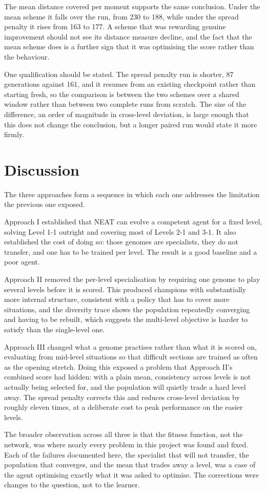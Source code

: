\noindent
The mean distance covered per moment supports the same conclusion. Under the
mean scheme it falls over the run, from 230 to 188, while under the spread
penalty it rises from 163 to 177. A scheme that was rewarding genuine
improvement should not see its distance measure decline, and the fact that the
mean scheme does is a further sign that it was optimising the score rather than
the behaviour.

\noindent
One qualification should be stated. The spread penalty run is shorter, 87
generations against 161, and it resumes from an existing checkpoint rather than
starting fresh, so the comparison is between the two schemes over a shared
window rather than between two complete runs from scratch. The size of the
difference, an order of magnitude in cross-level deviation, is large enough
that this does not change the conclusion, but a longer paired run would state
it more firmly.

\section{Discussion}
\label{sec:discussion}

The three approaches form a sequence in which each one addresses the limitation
the previous one exposed.

\noindent
Approach I established that NEAT can evolve a competent agent for a fixed
level, solving Level 1-1 outright and covering most of Levels 2-1 and 3-1. It
also established the cost of doing so: those genomes are specialists, they do
not transfer, and one has to be trained per level. The result is a good
baseline and a poor agent.

\noindent
Approach II removed the per-level specialisation by requiring one genome to
play several levels before it is scored. This produced champions with
substantially more internal structure, consistent with a policy that has to
cover more situations, and the diversity trace shows the population repeatedly
converging and having to be rebuilt, which suggests the multi-level objective
is harder to satisfy than the single-level one.

\noindent
Approach III changed what a genome practises rather than what it is scored on,
evaluating from mid-level situations so that difficult sections are trained as
often as the opening stretch. Doing this exposed a problem that Approach II's
combined score had hidden: with a plain mean, consistency across levels is not
actually being selected for, and the population will quietly trade a hard level
away. The spread penalty corrects this and reduces cross-level deviation by
roughly eleven times, at a deliberate cost to peak performance on the easier
levels.

\noindent
The broader observation across all three is that the fitness function, not the
network, was where nearly every problem in this project was found and fixed.
Each of the failures documented here, the specialist that will not transfer,
the population that converges, and the mean that trades away a level, was a
case of the agent optimising exactly what it was asked to optimise. The
corrections were changes to the question, not to the learner.
